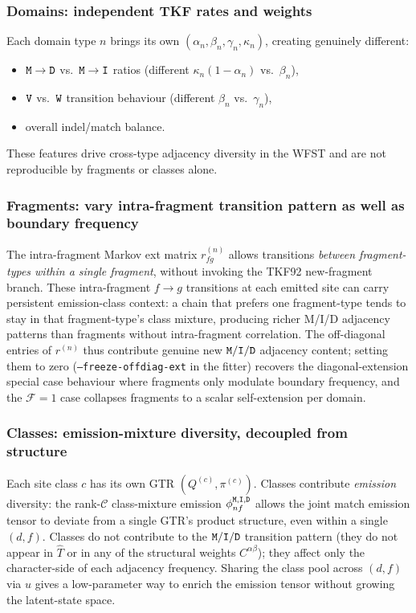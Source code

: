 \documentclass{article}
\newcommand\ext{r}
\newcommand\dom{n}
\newcommand\nfrag{\mathcal{F}}
\newcommand\classdist{u}
\newcommand\eqm{\pi}
\providecommand\exch{Q}
\newcommand\mat{{\tt M}}
\newcommand\ins{{\tt I}}
\newcommand\del{{\tt D}}
\newcommand\waitm{{\tt V}}
\newcommand\waitd{{\tt W}}
\newcommand\effT{\hat{T}}
\newcommand\frag{f}
\newcommand\srcfrag{f}
\newcommand\destfrag{g}
\newcommand\class{c}
\newcommand\nclasses{\mathcal{C}}
\begin{document}
\subsubsection{Domains: independent TKF rates and weights}

Each domain type $\dom$ brings its own $(\alpha_\dom, \beta_\dom,
\gamma_\dom, \kappa_\dom)$, creating genuinely different:
\begin{itemize}
\item $\mat\to\del$ vs.\ $\mat\to\ins$ ratios (different
  $\kappa_\dom(1-\alpha_\dom)$ vs.\ $\beta_\dom$),
\item $\waitm$ vs.\ $\waitd$ transition behaviour (different
  $\beta_\dom$ vs.\ $\gamma_\dom$),
\item overall indel/match balance.
\end{itemize}
These features drive cross-type adjacency diversity in the WFST and
are not reproducible by fragments or classes alone.

\subsubsection{Fragments: vary intra-fragment transition pattern as well as boundary frequency}

The intra-fragment Markov ext matrix
$\ext^{(\dom)}_{\srcfrag\destfrag}$ allows transitions \emph{between
fragment-types within a single fragment}, without invoking the TKF92
new-fragment branch. These intra-fragment $\srcfrag \to \destfrag$
transitions at each emitted site can carry persistent emission-class
context: a chain that prefers one fragment-type tends to stay in that
fragment-type's class mixture, producing richer M/I/D adjacency
patterns than fragments without intra-fragment correlation.
The off-diagonal entries of $\ext^{(\dom)}$ thus contribute genuine new
$\mat/\ins/\del$ adjacency content; setting them to zero
(\texttt{--freeze-offdiag-ext} in the fitter) recovers the
diagonal-extension special case behaviour where fragments only
modulate boundary frequency, and the $\nfrag = 1$ case collapses
fragments to a scalar self-extension per domain.

\subsubsection{Classes: emission-mixture diversity, decoupled from structure}

Each site class $\class$ has its own GTR
$(\exch^{(\class)}, \eqm^{(\class)})$. Classes contribute
\emph{emission} diversity: the rank-$\nclasses$ class-mixture emission
$\phi^{\mat,\ins,\del}_{\dom\frag}$ allows the joint match emission
tensor to deviate from a single GTR's product structure, even within a
single $(d,f)$. Classes do not contribute to the $\mat/\ins/\del$
transition pattern (they do not appear in $\effT$ or in any of the
structural weights $C^{\alpha\beta}$); they affect only the
character-side of each adjacency frequency. Sharing the class pool
across $(d,f)$ via $\classdist$ gives a low-parameter way to enrich
the emission tensor without growing the latent-state space.
\end{document}
